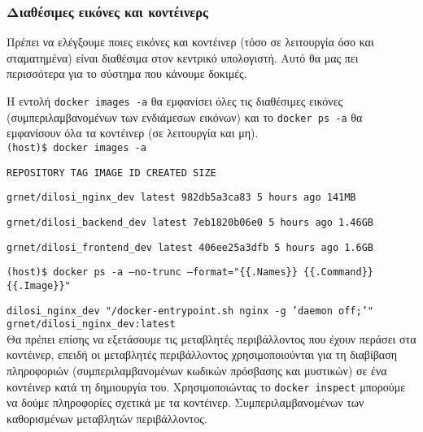 \subsubsection{Διαθέσιμες εικόνες και κοντέινερς}

Πρέπει να ελέγξουμε ποιες εικόνες και κοντέινερ (τόσο σε λειτουργία όσο και
σταματημένα) είναι διαθέσιμα στον κεντρικό υπολογιστή. Αυτό θα μας πει
περισσότερα για το σύστημα που κάνουμε δοκιμές.

Η εντολή \texttt{\textlatin{docker images -a}} θα εμφανίσει όλες τις διαθέσιμες
εικόνες (συμπεριλαμβανομένων των ενδιάμεσων εικόνων) και το
\texttt{\textlatin{docker ps -a}} θα εμφανίσουν όλα τα κοντέινερ (σε λειτουργία
και μη). \\

\texttt{\textlatin{(host)\$ docker images -a}}

\texttt{\textlatin{REPOSITORY \hspace{8em} TAG \hspace{1em} IMAGE ID \hspace{1em} CREATED \hspace{1em} SIZE}}

\texttt{\textlatin{grnet/dilosi\_nginx\_dev \hspace{2em} latest 982db5a3ca83 5 hours ago 141MB}}

\texttt{\textlatin{grnet/dilosi\_backend\_dev \hspace{1em} latest 7eb1820b06e0 5 hours ago 1.46GB}}

\texttt{\textlatin{grnet/dilosi\_frontend\_dev \hspace{0.5em} latest 406ee25a3dfb 5 hours ago 1.6GB}} 

\texttt{\textlatin{(host)\$ docker ps -a --no-trunc --format="\{\{.Names\}\} \{\{.Command\}\} \{\{.Image\}\}"}} 

\texttt{\textlatin{dilosi\_nginx\_dev "/docker-entrypoint.sh nginx -g 'daemon off;'" grnet/dilosi\_nginx\_dev:latest}} \\ 


Θα πρέπει επίσης να εξετάσουμε τις μεταβλητές περιβάλλοντος που έχουν περάσει
στα κοντέινερ, επειδή οι μεταβλητές περιβάλλοντος χρησιμοποιούνται για τη
διαβίβαση πληροφοριών (συμπεριλαμβανομένων κωδικών πρόσβασης και μυστικών) σε
ένα κοντέινερ κατά τη δημιουργία του. Χρησιμοποιώντας το
\texttt{\textlatin{docker inspect}} μπορούμε να δούμε πληροφορίες σχετικά με τα
κοντέινερ. Συμπεριλαμβανομένων των καθορισμένων μεταβλητών περιβάλλοντος. \\

